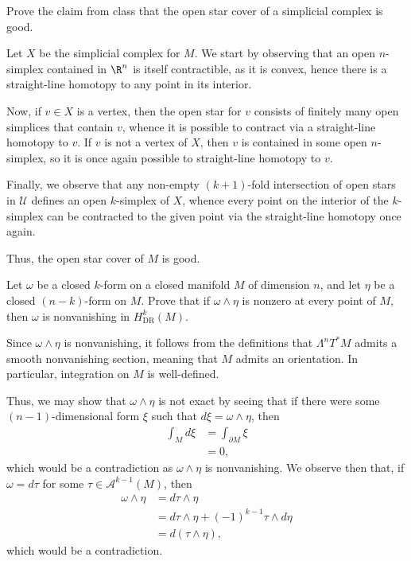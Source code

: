 \documentclass[10pt]{mypackage}
\begin{document}
\RaggedRight
\begin{problem}[Problem 2]
  Prove the claim from class that the open star cover of a simplicial complex is good.
\end{problem}
\begin{solution}
  Let $X$ be the simplicial complex for $M$. We start by observing that an open $n$-simplex contained in $\R^{n}$ is itself contractible, as it is convex, hence there is a straight-line homotopy to any point in its interior.\newline

  Now, if $v\in X$ is a vertex, then the open star for $v$ consists of finitely many open simplices that contain $v$, whence it is possible to contract via a straight-line homotopy to $v$. If $v$ is not a vertex of $X$, then $v$ is contained in some open $n$-simplex, so it is once again possible to straight-line homotopy to $v$.\newline

  Finally, we observe that any non-empty $\left( k+1 \right)$-fold intersection of open stars in $\mathcal{U}$ defines an open $k$-simplex of $X$, whence every point on the interior of the $k$-simplex can be contracted to the given point via the straight-line homotopy once again.\newline

  Thus, the open star cover of $M$ is good.
\end{solution}
\begin{problem}[Problem 3]
  Let $\omega$ be a closed $k$-form on a closed manifold $M$ of dimension $n$, and let $\eta$ be a closed $\left( n-k \right)$-form on $M$. Prove that if $\omega\wedge\eta$ is nonzero at every point of $M$, then $\omega$ is nonvanishing in $H^{k}_{\operatorname{DR}}\left( M \right)$.
\end{problem}
\begin{solution}
  Since $\omega\wedge\eta$ is nonvanishing, it follows from the definitions that $\Lambda^{n}T^{\ast}M$ admits a smooth nonvanishing section, meaning that $M$ admits an orientation. In particular, integration on $M$ is well-defined.\newline

  Thus, we may show that $\omega\wedge\eta$ is not exact by seeing that if there were some $\left( n-1 \right)$-dimensional form $\xi$ such that $d\xi = \omega\wedge\eta$, then
  \begin{align*}
    \int_{M}^{}d\xi &= \int_{\partial M}^{} \xi\\
                    &= 0,
  \end{align*}
  which would be a contradiction as $\omega\wedge\eta$ is nonvanishing. We observe then that, if $\omega = d\tau$ for some $\tau\in \mathcal{A}^{k-1}\left( M \right)$, then
  \begin{align*}
    \omega\wedge\eta &= d\tau\wedge\eta\\
                     &= d\tau\wedge\eta + \left( -1 \right)^{k-1} \tau\wedge d\eta\\
                     &= d\left( \tau\wedge\eta \right),
  \end{align*}
  which would be a contradiction.
\end{solution}
\end{document}
